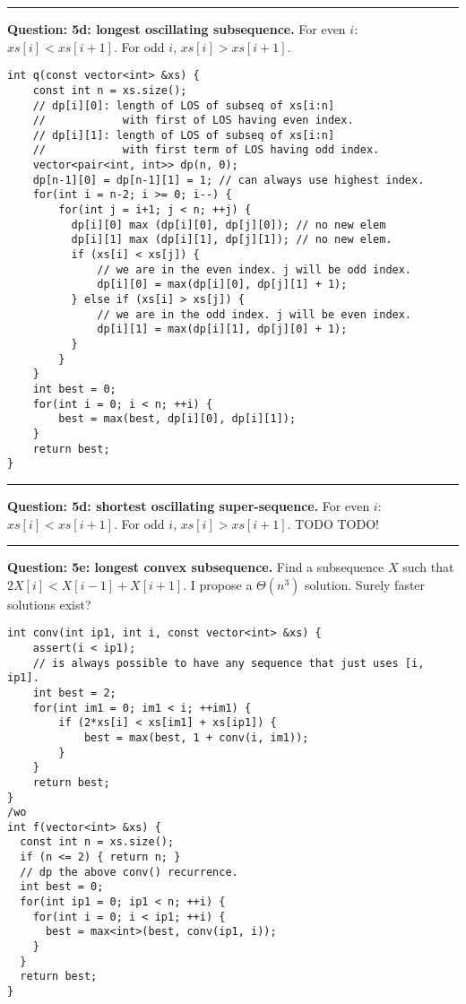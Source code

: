 \documentclass[14pt]{report}
\newcommand*{\question}[1]{\leavevmode\clearpage \par\noindent\rule{\textwidth}{0.4pt} \textbf{Question: #1.}}
\begin{document}
\question{5d: longest oscillating subsequence}
For even $i$: $xs[i] < xs[i+1]$. For odd $i$, $xs[i] > xs[i+1]$.
\begin{verbatim}
int q(const vector<int> &xs) {
    const int n = xs.size();
    // dp[i][0]: length of LOS of subseq of xs[i:n]
    //            with first of LOS having even index.
    // dp[i][1]: length of LOS of subseq of xs[i:n]
    //            with first term of LOS having odd index.
    vector<pair<int, int>> dp(n, 0);
    dp[n-1][0] = dp[n-1][1] = 1; // can always use highest index.
    for(int i = n-2; i >= 0; i--) {
        for(int j = i+1; j < n; ++j) {
          dp[i][0] max (dp[i][0], dp[j][0]); // no new elem
          dp[i][1] max (dp[i][1], dp[j][1]); // no new elem.
          if (xs[i] < xs[j]) {
              // we are in the even index. j will be odd index.
              dp[i][0] = max(dp[i][0], dp[j][1] + 1);
          } else if (xs[i] > xs[j]) {
              // we are in the odd index. j will be even index.
              dp[i][1] = max(dp[i][1], dp[j][0] + 1);
          }
        }
    }
    int best = 0;
    for(int i = 0; i < n; ++i) {
        best = max(best, dp[i][0], dp[i][1]);
    }
    return best;
}
\end{verbatim}

\question{5d: shortest oscillating super-sequence}
For even $i$: $xs[i] < xs[i+1]$. For odd $i$, $xs[i] > xs[i+1]$.
TODO TODO!

\question{5e: longest convex  subsequence}
Find a subsequence $X$ such that $2X[i] < X[i-1] + X[i+1]$. I propose
a $\Theta(n^3)$ solution. Surely faster solutions exist?

\begin{verbatim}
int conv(int ip1, int i, const vector<int> &xs) {
    assert(i < ip1);
    // is always possible to have any sequence that just uses [i, ip1].
    int best = 2;
    for(int im1 = 0; im1 < i; ++im1) {
        if (2*xs[i] < xs[im1] + xs[ip1]) {
            best = max(best, 1 + conv(i, im1));
        }
    }
    return best;
}
/wo
int f(vector<int> &xs) {
  const int n = xs.size();
  if (n <= 2) { return n; }
  // dp the above conv() recurrence.
  int best = 0;
  for(int ip1 = 0; ip1 < n; ++i) {
    for(int i = 0; i < ip1; ++i) {
      best = max<int>(best, conv(ip1, i));
    }
  }
  return best;
}
\end{verbatim}
\end{document}
